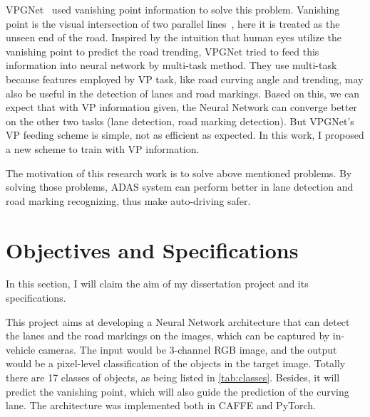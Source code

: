 \begin{spacing}{1.5}
VPGNet~\cite{lee2017vpgnet} used vanishing point information to solve this problem. Vanishing point is the visual intersection of two parallel lines~\cite{barnard1983interpreting}, here it is treated as the unseen end of the road.  Inspired by the intuition that human eyes utilize the vanishing point to predict the road trending, VPGNet tried to feed this information into neural network by multi-task method. They use multi-task because features employed by VP task, like road curving angle and trending, may also be useful in the detection of lanes and road markings. Based on this, we can expect that with VP information given, the Neural Network can converge better on the other two tasks (lane detection, road marking detection). But VPGNet’s VP feeding scheme is simple, not as efficient as expected. In this work, I proposed a new scheme to train with VP information.

The motivation of this research work is to solve above mentioned problems. By solving those problems, ADAS system can perform better in lane detection and road marking recognizing, thus make auto-driving safer.

\section{Objectives and Specifications}
\label{sec:IN_objectives}

In this section, I will claim the aim of my dissertation project and its specifications.

This project aims at developing a Neural Network architecture that can detect the lanes and the road markings on the images, which can be captured by in-vehicle cameras. The input would be 3-channel RGB image, and the output would be a pixel-level classification of the objects in the target image. Totally there are 17 classes of objects, as being listed in \autoref{tab:classes}. Besides, it will predict the vanishing point, which will also guide the prediction of the curving lane. The architecture was implemented both in CAFFE and PyTorch.


\end{spacing}
